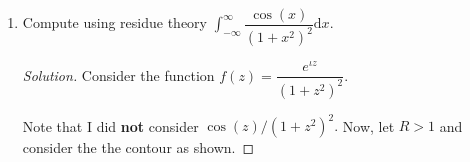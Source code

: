 \documentclass[12pt]{article}
\theoremstyle{definition}
\newenvironment{soln}{\begin{proof}[Solution]}{\end{proof}}
\begin{document}
\begin{enumerate}[leftmargin=*]
\begin{soln}
    	Noting that $\zeta^2 = \iota,$ we see that
    	\begin{align*} 
    		I_3(R) &= -\zeta\int_{0}^{R} e^{-\iota t^2} {\mathrm{d}}t\\
    		&= -\zeta\int_{0}^{R} (\cos t^2 - \iota\sin t^2) {\mathrm{d}}t.
    	\end{align*}

    	As observed earlier, we have
    	\begin{equation*} 
    		I_1(R) + I_2(R) + I_3(R) = 0
    	\end{equation*}
    	for all $R > 0.$ Letting $R \to \infty,$ we see that $I_2(R) \to 0$ and $I_1(R) \to \dfrac{\sqrt{\pi}}{2}.$ Thus, we get

    	\begin{equation*} 
    		\zeta\int_{0}^{\infty} (\cos t^2 - \iota\sin t^2) {\mathrm{d}}t = \dfrac{\sqrt{\pi}}{2}.
    	\end{equation*}
    	Letting $C \vcentcolon= \displaystyle\int_{0}^{\infty}\cos t^2{\mathrm{d}}t$ and $S$ the analogous one for $\sin,$ we note
    	\begin{align*} 
    		\zeta(C - \iota S) &= \dfrac{\sqrt{\pi}}{2}\\
    		\implies \dfrac{1}{\sqrt{2}}\left((C + S) + \iota(C - S)\right) &= \dfrac{\sqrt{\pi}}{2}.
    	\end{align*}
    	Since $C$ and $S$ are both real, we compare the real imaginary parts of the two sides above to finally get

    	\begin{equation*} 
    		C = S = \dfrac{\pi}{2\sqrt{2}},
    	\end{equation*}
    	as desired.
    \end{soln}
    \item Compute using residue theory $\displaystyle\int_{-\infty}^{\infty} \dfrac{\cos(x)}{(1 + x^2)^2} {\mathrm{d}}x.$
    \begin{soln}
    	Consider the function $f(z) = \dfrac{e^{\iota z}}{(1 + z^2)^2}.$

    	Note that I did \textbf{not} consider $\cos(z)/(1 + z^2)^2.$ Now, let $R > 1$ and consider the the contour as shown.


\end{soln}
\end{enumerate}
\end{document}
